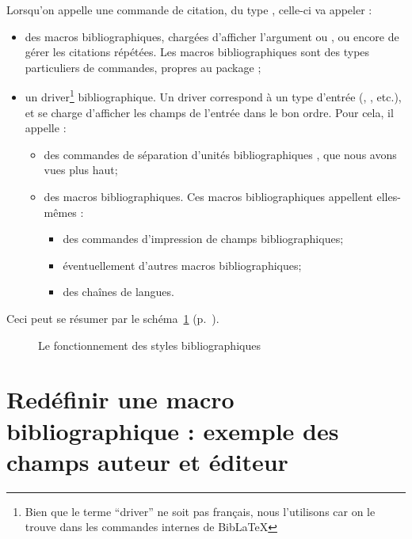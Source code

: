 Lorsqu'on appelle une commande de citation, du type , celle-ci va appeler :
    \begin{itemize}
        \item des macros bibliographiques, chargées d'afficher l'argument  ou , ou encore de gérer les citations répétées. Les macros bibliographiques sont des types particuliers de commandes, propres au package ;\label{macrobiblio} 
        \item un driver\footnote{Bien que le terme \enquote{driver} ne soit pas français, nous l'utilisons car on le trouve dans les commandes internes de BibLaTeX} bibliographique. Un driver correspond à un type d'entrée (, , etc.), et se charge d'afficher les champs de l'entrée dans le bon ordre. Pour cela, il appelle :
        \begin{itemize}
            \item des commandes de séparation d'unités bibliographiques
, que nous avons vues plus haut;
            \item des macros bibliographiques. Ces macros bibliographiques appellent elles-mêmes :
            \begin{itemize}
                \item des commandes d'impression de champs bibliographiques;
                \item éventuellement d'autres macros bibliographiques;
                \item des chaînes de langues.
            \end{itemize}
        \end{itemize}
        
    \end{itemize}

Ceci peut se résumer par le schéma~\ref{schemastylesbiblios} (p.~\pageref{schemastylesbiblios}). 

\begin{figure}[!]

\caption{Le fonctionnement des styles bibliographiques}\label{schemastylesbiblios}
\end{figure}



\section[Redéfinir une macro bibliographique]{Redéfinir une macro bibliographique : exemple des champs auteur et éditeur}


